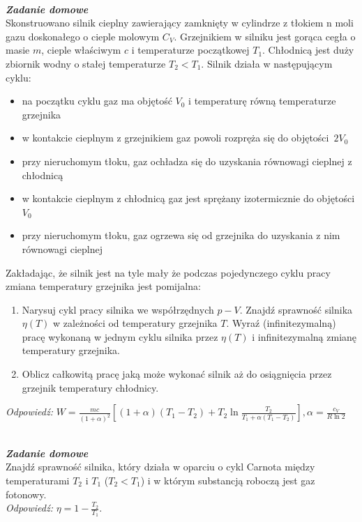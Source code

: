 \documentclass[11pt,a4paper]{article}
\newcounter{zadanie}\newcommand{\zadanie}[1][]{\addtocounter{zadanie}{1} ~\\  {\bf \emph{Zadanie \arabic{zadanie} #1 }} \\}
\newcounter{zaddom}\newcommand{\zaddom}[1][]{\addtocounter{zaddom}{1} ~\\  {\bf \emph{Zadanie domowe \arabic{zaddom} #1 }} \\}
\begin{document}
\zaddom
Skonstruowano silnik cieplny zawierający zamknięty w cylindrze 
z tłokiem n moli gazu doskonałego o cieple molowym  $C_V$.
Grzejnikiem w silniku jest gorąca cegła o masie $m$, cieple właściwym $c$ i temperaturze początkowej $T_1$. 
Chłodnicą jest duży zbiornik wodny o stałej temperaturze $T_2<T_1$. Silnik działa w następującym cyklu:
\begin{itemize}
\item[--] na początku cyklu gaz ma objętość $V_0$ i temperaturę równą temperaturze grzejnika
\item[--] w kontakcie cieplnym z grzejnikiem gaz powoli rozpręża się do objętości~$2V_0$
\item[--] przy nieruchomym tłoku, gaz ochładza się do uzyskania równowagi cieplnej z chłodnicą
\item[--] w kontakcie cieplnym z chłodnicą gaz jest sprężany izotermicznie do objętości $V_0$
\item[--] przy nieruchomym tłoku, gaz ogrzewa się od grzejnika do uzyskania z nim równowagi cieplnej
\end{itemize}

\noindent
Zakładając, że silnik jest na tyle mały że podczas pojedynczego cyklu pracy zmiana temperatury grzejnika jest pomijalna:
\begin{enumerate}
\item Narysuj cykl pracy silnika we współrzędnych $p-V$. Znajdź sprawność silnika $\eta(T)$ w zależności od temperatury grzejnika $T$. 
Wyraź (infinitezymalną) pracę wykonaną w jednym cyklu silnika przez $\eta(T)$ i infinitezymalną zmianę temperatury grzejnika.
\item Oblicz całkowitą pracę jaką może wykonać silnik aż do osiągnięcia 
przez grzejnik temperatury chłodnicy. \\[1mm]
\end{enumerate}

{\it Odpowiedź:} 
$W = \frac{mc}{(1+\alpha)^{2}} 
\left[  
    (1+\alpha)(T_{1} - T_{2}) + T_{2} \ln \frac{T_{2}}{T_{1} + \alpha (T_{1} - T_{2})}
\right], \alpha = \frac{c_{V}}{R\ln2}
$

\zaddom
Znajdź sprawność silnika, który działa w oparciu o cykl Carnota między temperaturami 
$T_2$ i $T_1$ ($T_2<T_1$) i w którym substancją roboczą jest gaz fotonowy.\\[1mm]

{\it Odpowiedź:} 
$\eta = 1 - \frac{T_2}{T_1}$.


\end{document}
